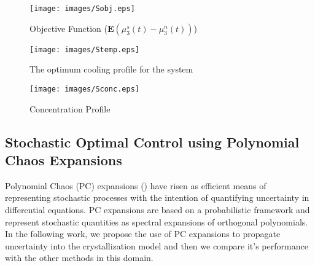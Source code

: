 \documentclass[3p,times,authoryear]{elsarticle}
\begin{document}
\begin{figure}[h!]

\begin{center}
\texttt{[image: images/Sobj.eps]}
\end{center}
\caption{Objective Function ($\mathbf{E}\left(\mu_{3}^{s}(t) - \mu_{3}^{n}(t)\right)$)} \label{Sobj}
\end{figure}
\begin{figure}[h!] 

\begin{center}
\texttt{[image: images/Stemp.eps]}
\end{center}
\caption{The optimum cooling profile for the system} \label{Stemp}
\end{figure}

\begin{figure}[h!] 

\begin{center}
\texttt{[image: images/Sconc.eps]}
\end{center}
\caption{Concentration Profile}
\end{figure}


\subsection{Stochastic Optimal Control using Polynomial Chaos Expansions}

Polynomial Chaos (PC) expansions (\cite{wiener}) have risen as efficient means of representing stochastic processes with the intention of quantifying uncertainty in differential equations. PC expansions are based on a probabilistic framework and represent stochastic quantities as spectral expansions of orthogonal polynomials. In the following work, we propose the use of PC expansions to propagate uncertainty into the crystallization model and then we compare it's performance with the other methods in this domain. 
\end{document}
